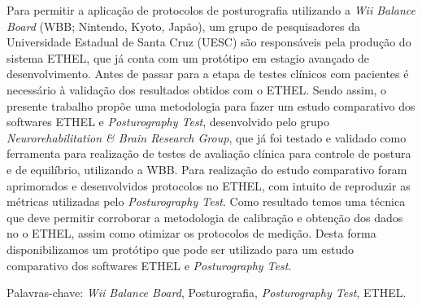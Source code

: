 
\setlength{\absparsep}{18pt} %
\begin{resumo}
Para permitir a aplicação de protocolos de posturografia utilizando a \textit{Wii Balance Board} (WBB; Nintendo, Kyoto, Japão), um grupo de pesquisadores da Universidade Estadual de Santa Cruz (UESC) são responsáveis pela produção do sistema ETHEL, que já conta com um protótipo em estagio avançado de desenvolvimento. Antes de passar para a etapa de testes clínicos com pacientes é necessário à validação dos resultados obtidos com o ETHEL. Sendo assim, o presente trabalho propõe %
uma metodologia para fazer um estudo comparativo dos softwares ETHEL e \textit{Posturography Test}, desenvolvido pelo grupo \textit{Neurorehabilitation \& Brain Research Group},  que já foi testado e validado como ferramenta para realização de testes de avaliação clínica para controle de postura e de equilíbrio, utilizando a WBB. %
Para realização do estudo comparativo foram aprimorados e desenvolvidos protocolos no ETHEL, com intuito de reproduzir as métricas utilizadas pelo \textit{Posturography Test}. Como resultado temos uma técnica que deve permitir corroborar a metodologia de calibração e obtenção dos dados no o ETHEL, assim como otimizar os protocolos de medição. Desta forma disponibilizamos um protótipo que pode ser utilizado para um estudo comparativo dos softwares ETHEL e \textit{Posturography Test}.
\vspace{\onelineskip}
 
\noindent 
Palavras-chave:  \textit{Wii Balance Board}, Posturografia, \textit{Posturography Test}, ETHEL.
\end{resumo}


 

% 
%
%  
